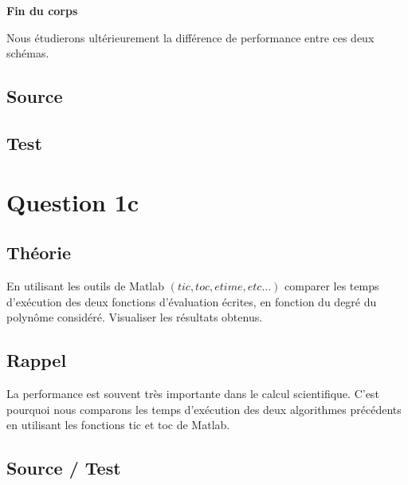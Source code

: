 \documentclass[a4paper,10pt]{report}
\begin{document}
\textbf{Fin du corps}

Nous étudierons ultérieurement la différence de performance entre ces deux schémas. 

\newpage
\subsection*{Source}



\subsection*{Test}

\begin{center}
	
\end{center}

\section*{Question 1c}

\subsection*{Théorie}

En utilisant les outils de Matlab $(tic, toc, etime, etc...)$ comparer les temps
d’exécution des deux fonctions d’évaluation écrites, en fonction du degré
du polynôme considéré. Visualiser les résultats obtenus.

\subsection*{Rappel}

La performance est souvent très importante dans le calcul scientifique. C’est pourquoi nous comparons les temps d’exécution des deux algorithmes précédents en utilisant les fonctions tic et toc de Matlab.

\subsection*{Source / Test}
\end{document}

